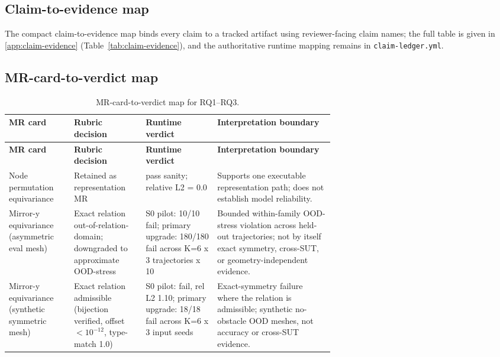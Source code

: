 \documentclass[preprint,12pt]{elsarticle}
\begin{document}
\subsection{Claim-to-evidence map}
\label{subsec:claim-evidence-map}

The compact claim-to-evidence map binds every claim to a tracked artifact using reviewer-facing claim names; the full table is given in \ref{app:claim-evidence} (Table~\ref{tab:claim-evidence}), and the authoritative runtime mapping remains in \texttt{claim-ledger.yml}.

\subsection{MR-card-to-verdict map}
\label{subsec:mr-card-verdict-map}

{
\small
\renewcommand{\arraystretch}{0.96}
\setlength{\tabcolsep}{3pt}
\begin{xltabular}{\linewidth}{@{}>{\raggedright\arraybackslash}p{0.20\linewidth}>{\raggedright\arraybackslash}p{0.22\linewidth}>{\raggedright\arraybackslash}p{0.22\linewidth}Y@{}}
\caption{MR-card-to-verdict map for RQ1--RQ3.}\label{tab:mr-card-verdict}\\
\toprule
\textbf{MR card} & \textbf{Rubric decision} & \textbf{Runtime verdict} & \textbf{Interpretation boundary} \\
\midrule
\endfirsthead
\toprule
\textbf{MR card} & \textbf{Rubric decision} & \textbf{Runtime verdict} & \textbf{Interpretation boundary} \\
\midrule
\endhead
\bottomrule
\endlastfoot
Node permutation equivariance & Retained as representation MR & pass sanity; relative L2 = 0.0 & Supports one executable representation path; does not establish model reliability. \\
Mirror-y equivariance (asymmetric eval mesh) & Exact relation out-of-relation-domain; downgraded to approximate OOD-stress & S0 pilot: 10/10 fail; primary upgrade: 180/180 fail across K=6 x 3 trajectories x 10 & Bounded within-family OOD-stress violation across held-out trajectories; not by itself exact symmetry, cross-SUT, or geometry-independent evidence. \\
Mirror-y equivariance (synthetic symmetric mesh) & Exact relation admissible (bijection verified, offset $<10^{-12}$, type-match 1.0) & S0 pilot: fail, rel L2 1.10; primary upgrade: 18/18 fail across K=6 x 3 input seeds & Exact-symmetry failure where the relation is admissible; synthetic no-obstacle OOD meshes, not accuracy or cross-SUT evidence. \\

\end{xltabular}}
\end{document}
